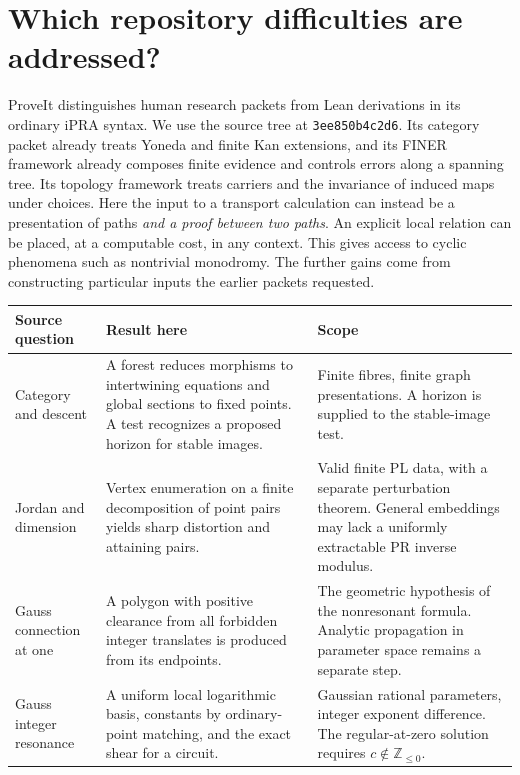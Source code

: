 \documentclass[11pt,letterpaper]{article}
\theoremstyle{definition}\newtheorem{definition}[theorem]{Definition}
\begin{document}
\section{Which repository difficulties are addressed?}\label{sec:sources}
ProveIt distinguishes human research packets from Lean derivations in its ordinary iPRA syntax. We use the source tree at \texttt{3ee850b4c2d6}. Its category packet already treats Yoneda and finite Kan extensions, and its FINER framework already composes finite evidence and controls errors along a spanning tree. Its topology framework treats carriers and the invariance of induced maps under choices. Here the input to a transport calculation can instead be a presentation of paths \emph{and a proof between two paths}. An explicit local relation can be placed, at a computable cost, in any context. This gives access to cyclic phenomena such as nontrivial monodromy. The further gains come from constructing particular inputs the earlier packets requested. \cite{target,category,finer,tower}

\begin{center}\small
\begin{tabularx}{\linewidth}{@{}p{.20\linewidth}XX@{}}
\toprule
\textbf{Source question} & \textbf{Result here} & \textbf{Scope} \\
\midrule
Category and descent \cite{category} & A forest reduces morphisms to intertwining equations and global sections to fixed points. A test recognizes a proposed horizon for stable images. & Finite fibres, finite graph presentations. A horizon is supplied to the stable-image test.\\[3pt]
Jordan and dimension \cite{jordan,dimension} & Vertex enumeration on a finite decomposition of point pairs yields sharp distortion and attaining pairs. & Valid finite PL data, with a separate perturbation theorem. General embeddings may lack a uniformly extractable PR inverse modulus.\\[3pt]
Gauss connection at one \cite{hyper} & A polygon with positive clearance from all forbidden integer translates is produced from its endpoints. & The geometric hypothesis of the nonresonant formula. Analytic propagation in parameter space remains a separate step.\\[3pt]
Gauss integer resonance \cite{hyper,dlmf} & A uniform local logarithmic basis, constants by ordinary-point matching, and the exact shear for a circuit. & Gaussian rational parameters, integer exponent difference. The regular-at-zero solution requires $c\notin\mathbb Z_{\le0}$.\\
\bottomrule
\end{tabularx}
\end{center}
\end{document}
